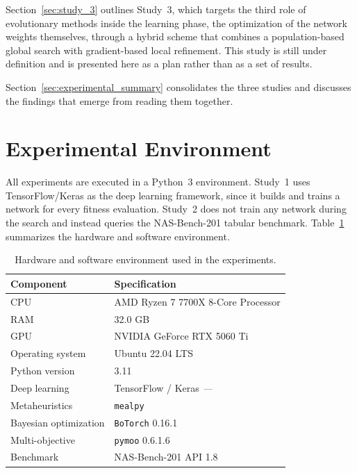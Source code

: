 Section~\ref{sec:study_3} outlines Study~3, which targets the third role of evolutionary methods inside the learning phase, the optimization of the network weights themselves, through a hybrid scheme that combines a population-based global search with gradient-based local refinement. This study is still under definition and is presented here as a plan rather than as a set of results.

Section~\ref{sec:experimental_summary} consolidates the three studies and discusses the findings that emerge from reading them together.


\section{Experimental Environment}
\label{sec:experimental_environment}

All experiments are executed in a Python~3 environment. Study~1 uses TensorFlow/Keras as the deep learning framework, since it builds and trains a network for every fitness evaluation. Study~2 does not train any network during the search and instead queries the NAS-Bench-201 tabular benchmark. Table~\ref{tab:hardware} summarizes the hardware and software environment.

\begin{table}[ht]
    \centering
    \caption{Hardware and software environment used in the experiments.}
    \label{tab:hardware}
    \begin{tabular}{ll}
        \toprule
        \textbf{Component}    & \textbf{Specification} \\
        \midrule
        CPU                   & AMD Ryzen 7 7700X 8-Core Processor \\
        RAM                   & 32.0 GB \\
        GPU                   & NVIDIA GeForce RTX 5060 Ti \\
        Operating system      & Ubuntu 22.04 LTS \\
        Python version        & 3.11 \\
        Deep learning         & TensorFlow / Keras \textit{---} \\ %
        Metaheuristics        & \texttt{mealpy}~\cite{van2023mealpy} \\
        Bayesian optimization & \texttt{BoTorch} 0.16.1 \\
        Multi-objective       & \texttt{pymoo} 0.6.1.6 \\
        Benchmark             & NAS-Bench-201 API 1.8 \\
        \bottomrule
    \end{tabular}
\end{table}

